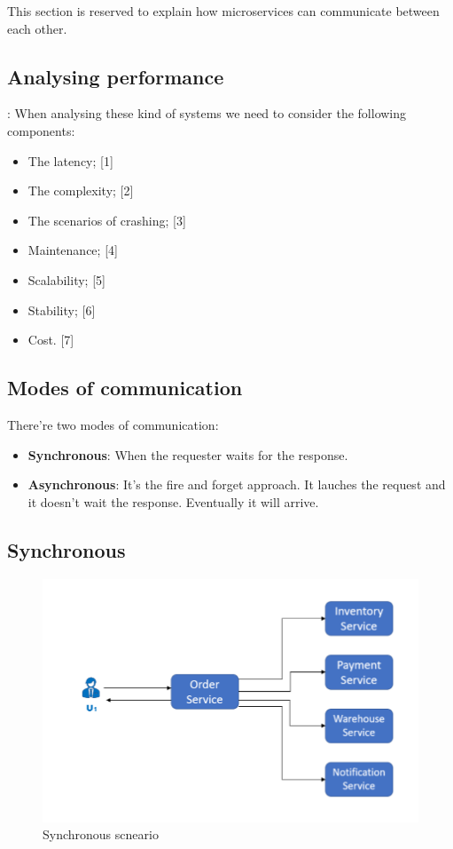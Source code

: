This section is reserved to explain how microservices can communicate between each other. 
\subsection{Analysing performance}:
When analysing these kind of systems we need to consider the following components:  
\begin{itemize}
    \item The latency; [1]
    \item The complexity; [2]
    \item The scenarios of crashing; [3]
    \item Maintenance; [4]
    \item Scalability; [5]
    \item Stability; [6]
    \item Cost. [7]
\end{itemize}


\subsection{Modes of communication}

There're two modes of communication:
\begin{itemize}
    \item \textbf{Synchronous}: When the requester waits for the response. 
    \item \textbf{Asynchronous}: It's the fire and forget approach. It lauches
    the request and it doesn't wait the response. Eventually it will arrive. 
\end{itemize}

\subsection{Synchronous}

\begin{figure}[h]
\centering
\includegraphics[width=0.8\linewidth]{figures/02_interservice_communication/sync_scenario.png}
\caption{Synchronous scneario}
\label{fig:sync_scenario}
\end{figure}


